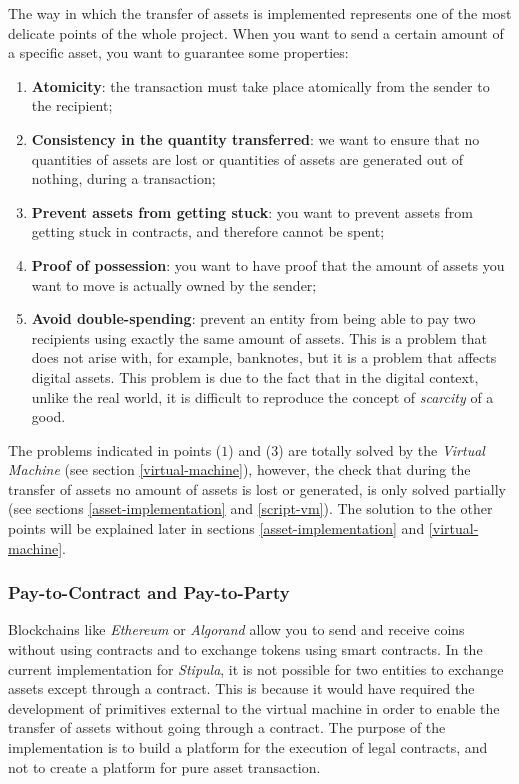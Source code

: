 The way in which the transfer of assets is implemented represents one of the most delicate points of the 
whole project. When you want to send a certain amount of a specific asset, you want to guarantee some 
properties:
\begin{enumerate}
	\item \textbf{Atomicity}: the transaction must take place atomically from the sender to the recipient;
	\item \textbf{Consistency in the quantity transferred}: we want to ensure that no quantities of assets 
	are lost or quantities of assets are generated out of nothing, during a transaction;
	\item \textbf{Prevent assets from getting stuck}: you want to prevent assets from getting stuck in 
	contracts, and therefore cannot be spent;
	\item \textbf{Proof of possession}: you want to have proof that the amount of assets you want to move is 
	actually owned by the sender;
	\item \textbf{Avoid double-spending}: prevent an entity from being able to pay two recipients using 
	exactly the same amount of assets. This is a problem that does not arise with, for example, banknotes, 
	but it is a problem that affects digital assets. This problem is due to the fact that in the digital 
	context, unlike the real world, it is difficult to reproduce the concept of \textit{scarcity} of a good.
\end{enumerate}

The problems indicated in points ($1$) and ($3$) are totally solved by the \textit{Virtual Machine} 
(see section \ref{virtual-machine}), however, the check that during the transfer of assets no amount of 
assets is lost or generated, is only solved partially (see sections \ref{asset-implementation} and 
\ref{script-vm}). The solution to the other points will be explained later in sections 
\ref{asset-implementation} and \ref{virtual-machine}.

\subsubsection{Pay-to-Contract and Pay-to-Party}
\label{pay-to-contract-and-pay-to-party}

Blockchains like \textit{Ethereum} or \textit{Algorand} allow you to send and receive coins without using 
contracts and to exchange tokens using smart contracts. In the current implementation for \textit{Stipula}, 
it is not possible for two entities to exchange assets except through a contract. This is because it would 
have required the development of primitives external to the virtual machine in order to enable the transfer 
of assets without going through a contract. The purpose of the implementation is to build a platform for the 
execution of legal contracts, and not to create a platform for pure asset transaction.

